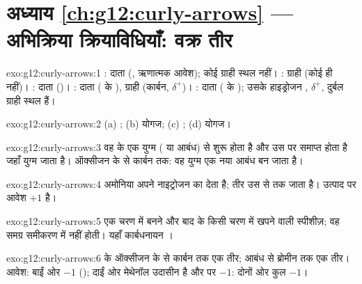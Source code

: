 \section*{अध्याय \ref{ch:g12:curly-arrows} --- अभिक्रिया क्रियाविधियाँ: वक्र तीर}

\begin{solution}{exo:g12:curly-arrows:1}
: दाता (, ऋणात्मक आवेश); कोई ग्राही स्थल नहीं।
: ग्राही (कोई  ही नहीं)। : दाता ()।
: दाता ( के ), ग्राही (कार्बन,
$\delta^+$)। : दाता ( के ); उसके हाइड्रोजन ,
$\delta^+$, दुर्बल ग्राही स्थल हैं।
\end{solution}

\begin{solution}{exo:g12:curly-arrows:2}
(a) ; (b) योगज; (c) ; (d) योगज।
\end{solution}

\begin{solution}{exo:g12:curly-arrows:3}
वह  के एक युग्म ( या आबंध) से शुरू होता है और उस  पर
समाप्त होता है जहाँ युग्म जाता है। ऑक्सीजन के  से कार्बन तक: वह
युग्म एक नया  आबंध बन जाता है।
\end{solution}

\begin{solution}{exo:g12:curly-arrows:4}
अमोनिया अपने नाइट्रोजन का  देता है; तीर उस
 से  तक जाता है। उत्पाद  पर आवेश $+1$ है।
\end{solution}

\begin{solution}{exo:g12:curly-arrows:5}
एक चरण में बनने और बाद के किसी चरण में खपने वाली स्पीशीज़; वह
समग्र समीकरण में नहीं होती। यहाँ कार्बधनायन ।
\end{solution}

\begin{solution}{exo:g12:curly-arrows:6}
 के ऑक्सीजन के  से कार्बन तक एक तीर;
 आबंध से ब्रोमीन तक एक तीर। आवेश: बाईं ओर $-1$
(); दाईं ओर मेथेनॉल उदासीन है और  पर $-1$:
दोनों ओर कुल $-1$।
\end{solution}

